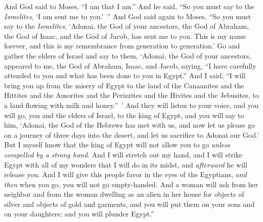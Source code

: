 \begin{biblechapter}
\verse And God said to Moses, “I am that I am.” And he said, “So you must say to the \textit{Israelites}, ‘I am sent me to you.’ ”
\verse And God said again to Moses, “So you must say to the \textit{Israelites}, ‘Adonai, the God of your ancestors, the God of Abraham, the God of Isaac, and the God of Jacob, has sent me to you. This is my name forever, and this is my remembrance from generation to generation.’
\verse Go and gather the elders of Israel and say to them, ‘Adonai, the God of your ancestors, appeared to me, the God of Abraham, Isaac, and Jacob, saying, “I have carefully attended to you and what has been done to you in Egypt.”
\verse And I said, “I will bring you up from the misery of Egypt to the land of the Canaanites and the Hittites and the Amorites and the Perizzites and the Hivites and the Jebusites, to a land flowing with milk and honey.” ’
\verse And they will listen to your voice, and you will go, you and the elders of Israel, to the king of Egypt, and you will say to him, ‘Adonai, the God of the Hebrews has met with us, and now let us please go on a journey of three days into the desert, and let us sacrifice to Adonai our God.’
\verse But I myself know that the king of Egypt will not allow you to go \textit{unless compelled by a strong hand}.
\verse And I will stretch out my hand, and I will strike Egypt with all of my wonders that I will do in its midst, and \textit{afterward} he will release you.
\verse And I will give this people favor in the eyes of the Egyptians, \textit{and then} when you go, you will not go empty-handed.
\verse And a woman will ask from her neighbor and from the woman dwelling as an alien in her house for objects of silver and objects of gold and garments, and you will put them on your sons and on your daughters; and you will plunder Egypt.”
\end{biblechapter}

